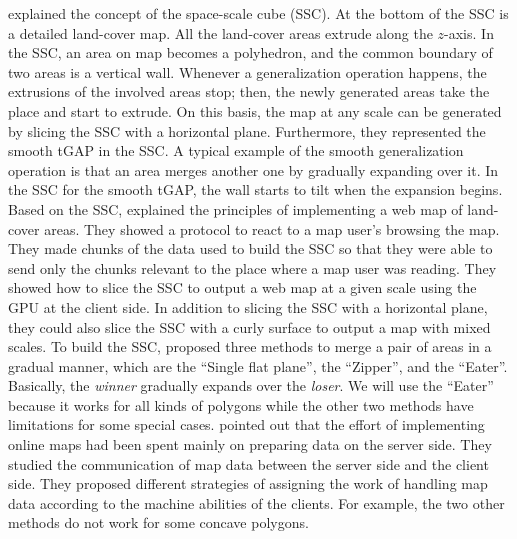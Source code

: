 \documentclass[ijgi,article,submit,moreauthors,pdftex]{Definitions/mdpi}
\begin{document}
\citet{vanOosterom2014Support} explained the concept of the space-scale cube (SSC).
At the bottom of the SSC is a detailed land-cover map.
All the land-cover areas extrude along the $z$-axis.
In the SSC, an area on map becomes a polyhedron, and
the common boundary of two areas is a vertical wall.
Whenever a generalization operation happens, 
the extrusions of the involved areas stop;
then, the newly generated areas take the place and start to extrude.
On this basis, the map at any scale can be generated by slicing the SSC 
with a horizontal plane.
Furthermore, they represented the smooth tGAP in the SSC.
A typical example of the smooth generalization operation is that 
an area merges another one by gradually expanding over it.
In the SSC for the smooth tGAP, 
the wall starts to tilt when the expansion begins.
Based on the SSC, \citet{Meijers2020Web} explained the principles of 
implementing a web map of land-cover areas.
They showed a protocol to react to a map user's browsing the map.
They made chunks of the data used to build the SSC
so that they were able to send only the chunks relevant to the place
where a map user was reading.
They showed how to slice the SSC to output a web map at a given scale 
using the GPU at the client side.
In addition to slicing the SSC with a horizontal plane,
they could also slice the SSC with a curly surface 
to output a map with mixed scales.
To build the SSC, \citet{Suba2014Merge} proposed three methods 
to merge a pair of areas in a gradual manner, 
which are the ``Single flat plane'', the ``Zipper'', and the ``Eater''.
Basically, the \emph{winner} gradually expands over the \emph{loser}.
We will use the ``Eater'' because it works for all kinds of polygons 
while the other two methods have limitations for some special cases.
\citet{Huang2016Webmap} pointed out that
the effort of implementing online maps 
had been spent mainly on preparing data on the server side.
They studied the communication of map data 
between the server side and the client side.
They proposed different strategies of assigning 
the work of handling map data
according to the machine abilities of the clients.
For example, the two other methods do not work for some concave polygons.
\end{document}
